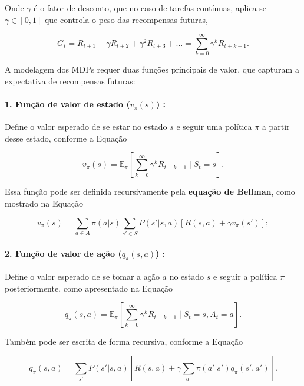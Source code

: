 Onde \(\gamma\) é o fator de desconto, que no caso de tarefas contínuas, aplica-se \(\gamma \in [0, 1]\) que controla o peso das recompensas futuras,

\begin{equation}
\label{eq:retorno_infinito}
G_t = R_{t+1} + \gamma R_{t+2} + \gamma^2 R_{t+3} + \dots = \sum_{k=0}^{\infty} \gamma^k R_{t+k+1}.
\end{equation}

A modelagem dos MDPs requer duas funções principais de valor, que capturam a expectativa de recompensas futuras:

\paragraph{1. Função de valor de estado (\(v_\pi(s)\)) \cite{sutton}:}
Define o valor esperado de se estar no estado \(s\) e seguir uma política \(\pi\) a partir desse estado, conforme a Equação 

\begin{equation}
\label{eq:valor_estado}
v_\pi(s) = \mathbb{E}_\pi \left[ \sum_{k=0}^{\infty} \gamma^k R_{t+k+1} \mid S_t = s \right].
\end{equation}

Essa função pode ser definida recursivamente pela \textbf{equação de Bellman}, como mostrado na Equação 

\begin{equation}
\label{eq:bellman_estado}
v_\pi(s) = \sum_{a \in A} \pi(a|s) \sum_{s' \in S} P(s'|s, a) \left[ R(s, a) + \gamma v_\pi(s') \right];
\end{equation}

\paragraph{2. Função de valor de ação (\(q_\pi(s, a)\)) \cite{sutton}:}
Define o valor esperado de se tomar a ação \(a\) no estado \(s\) e seguir a política \(\pi\) posteriormente, como apresentado na Equação 

\begin{equation}
\label{eq:valor_acao}
q_\pi(s, a) = \mathbb{E}_\pi \left[ \sum_{k=0}^{\infty} \gamma^k R_{t+k+1} \mid S_t = s, A_t = a \right].
\end{equation}

Também pode ser escrita de forma recursiva, conforme a Equação 

\begin{equation}
\label{eq:bellman_acao}
q_\pi(s, a) = \sum_{s'} P(s'|s, a) \left[ R(s, a) + \gamma \sum_{a'} \pi(a'|s') q_\pi(s', a') \right].
\end{equation}


